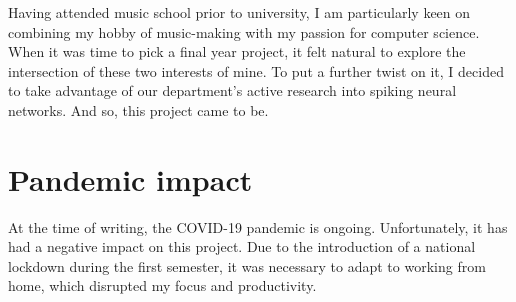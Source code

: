 \documentclass[../../report.tex]{subfiles}
\begin{document}
Having attended music school prior to university, I am particularly keen on
combining my hobby of music-making with my passion for computer science. When it
was time to pick a final year project, it felt natural to explore the
intersection of these two interests of mine. To put a further twist on it, I
decided to take advantage of our department's active research into spiking
neural networks. And so, this project came to be.

\section{Pandemic impact}

At the time of writing, the COVID-19 pandemic is ongoing. Unfortunately, it has
had a negative impact on this project. Due to the introduction of a national
lockdown during the first semester, it was necessary to adapt to working from
home, which disrupted my focus and productivity.
\end{document}
